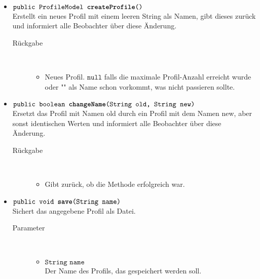 \begin{description}
\begin{itemize}
		\item $\texttt{public ProfileModel \textbf{createProfile}()}$ \\ Erstellt ein neues Profil mit einem leeren String als Namen, gibt dieses zurück und informiert alle Beobachter über diese Änderung.
		\begin{description}
			\item[Rückgabe] \hfill \\
			\vspace{-.8cm}
			\begin{itemize}
				\item Neues Profil. $\texttt{null}$ falls die maximale Profil-Anzahl erreicht wurde oder "" als Name schon vorkommt, was nicht passieren sollte.
			\end{itemize}
		\end{description}
		
		\item $\texttt{public boolean \textbf{changeName}(String old, String new)}$ \\ Ersetzt das Profil mit Namen old durch ein Profil mit dem Namen new, aber sonst identischen Werten und informiert alle Beobachter über diese Änderung.
		\begin{description}
			\item[Rückgabe] \hfill \\
			\vspace{-.8cm}
			\begin{itemize}
				\item Gibt zurück, ob die Methode erfolgreich war.
			\end{itemize}
		\end{description}
		
		\item $\texttt{public void \textbf{save}(String name)}$ \\ Sichert das angegebene Profil als Datei.
		\begin{description}
			\item[Parameter] \hfill \\
			\vspace{-.8cm}
			\begin{itemize}
				\item $\texttt{String name}$ \\ Der Name des Profils, das gespeichert werden soll.
			\end{itemize}
		\end{description}
		

\end{itemize}
\end{description}
